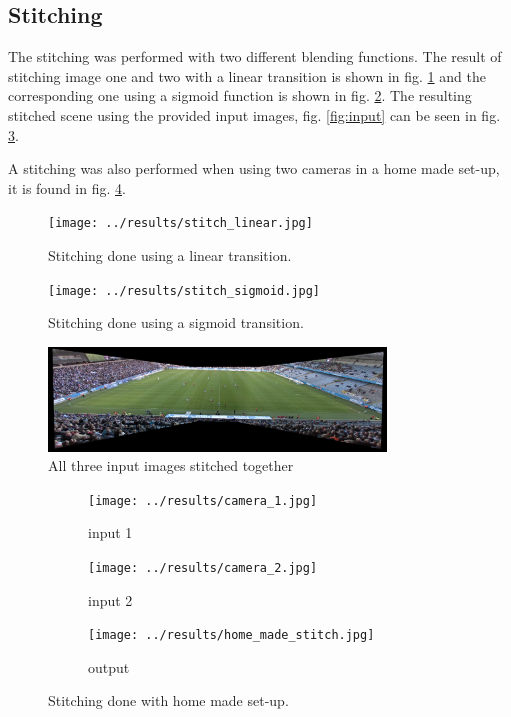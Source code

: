 \subsection{Stitching}
The stitching was performed with two different blending functions.
The result of stitching image one and two with a linear transition is shown in fig. \ref{fig:results:stitching:linear} and the corresponding one using a sigmoid function is shown in fig. \ref{fig:results:stitching:sigmoid}.
The resulting stitched scene using the provided input images, fig. \ref{fig:input} can be seen in fig. \ref{fig:res_stitch}.

A stitching was also performed when using two cameras in a home made set-up, it is found in fig. \ref{fig:results:stitching:homemade}.

\begin{figure}[H]
  \centering
  \texttt{[image: ../results/stitch\_linear.jpg]}
  \caption{Stitching done using a linear transition.}
  \label{fig:results:stitching:linear}
\end{figure}

\begin{figure}[H]
  \centering
  \texttt{[image: ../results/stitch\_sigmoid.jpg]}
  \caption{Stitching done using a sigmoid transition.}
  \label{fig:results:stitching:sigmoid}
\end{figure}

\begin{figure}
	\centering
	\includegraphics[width=0.8\textwidth]{../results/images/res_stitch.PNG}
	\caption{All three input images stitched together}
	\label{fig:res_stitch}
\end{figure}

\begin{figure}
	\centering
	\begin{subfigure}[t]{0.3\textwidth}
		\centering
		\texttt{[image: ../results/camera\_1.jpg]}
		\caption{input 1}
	\end{subfigure}
	\begin{subfigure}[t]{0.3\textwidth}
		\centering
		\texttt{[image: ../results/camera\_2.jpg]}
		\caption{input 2}
	\end{subfigure}
		\begin{subfigure}[t]{0.3\textwidth}
		\centering
                \texttt{[image: ../results/home\_made\_stitch.jpg]}
		\caption{output}
	\end{subfigure}
        \caption{Stitching done with home made set-up.}
	\label{fig:results:stitching:homemade}
\end{figure}
